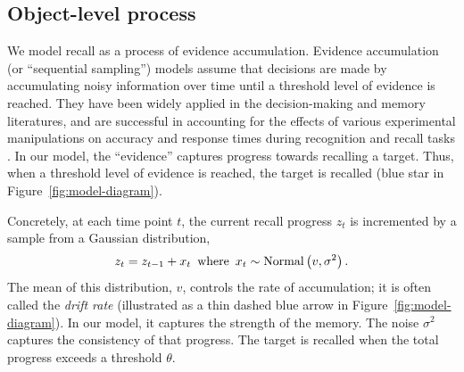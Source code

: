 \subsection{Object-level process}

We model recall as a process of evidence accumulation. Evidence accumulation (or ``sequential sampling'') models assume that decisions are made by accumulating noisy information over time until a threshold level of evidence is reached. They have been widely applied in the decision-making \citep{busemeyer1993decision,usher2001time,ditterich2006stochastic,krajbich2010visual} and memory \citep{ratcliff1978theory,sederberg2008context} literatures, and are successful in accounting for the effects of various experimental manipulations on accuracy and response times during recognition and recall tasks \citep{ratcliff2002estimating,sederberg2008context,yonelinas2010recollection}. In our model, the ``evidence'' captures progress towards recalling a target. Thus, when a threshold level of evidence is reached, the target is recalled (blue star in Figure~\ref{fig:model-diagram}).

Concretely, at each time point $t$, the current recall progress $z_t$ is incremented by a sample from a Gaussian distribution,
%
\begin{equation}\label{eq:evidence}
  z_t = z_{t-1} + x_t \,\text{ where }\,
  x_t \sim \mathrm{Normal}\left( v, \sigma^2 \right).
\end{equation}
%
The mean of this distribution, $v$, controls the rate of accumulation; it is often called the \emph{drift rate} (illustrated as a thin dashed blue arrow in Figure~\ref{fig:model-diagram}). In our model, it captures the strength of the memory. The noise $\sigma^2$ captures the consistency of that progress. The target is recalled when the total progress exceeds a threshold $\theta$.


